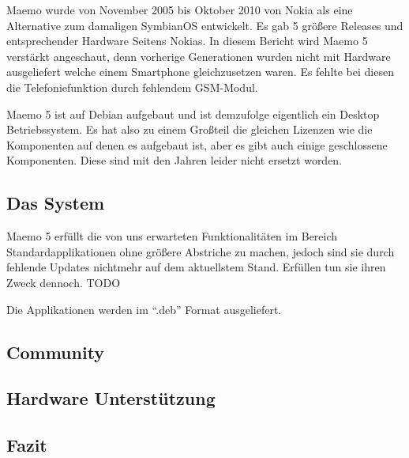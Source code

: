 Maemo wurde von November 2005\cite{online:maemo1-770} bis Oktober 2010\cite{online:maemo5-n900} von Nokia als eine Alternative zum damaligen \mbox{SymbianOS} entwickelt. Es gab 5 größere Releases und entsprechender Hardware Seitens Nokias\cite{online:maemo1-770}\cite{online:n800-specs}\cite{online:n810-specs}\cite{online:n900-specs}. In diesem Bericht wird Maemo 5 verstärkt angeschaut, denn vorherige Generationen wurden nicht mit Hardware ausgeliefert welche einem Smartphone gleichzusetzen waren. Es fehlte bei diesen die Telefoniefunktion durch fehlendem GSM-Modul.

Maemo 5 ist auf Debian aufgebaut\cite{online:maemo-about} und ist demzufolge eigentlich ein Desktop Betriebssystem. Es hat also zu einem Großteil die gleichen Lizenzen wie die Komponenten auf denen es aufgebaut ist, aber es gibt auch einige geschlossene Komponenten\cite{online:maemo5-components}. Diese sind mit den Jahren leider nicht ersetzt worden.\\

\subsection{Das System}
Maemo 5 erfüllt die von uns erwarteten Funktionalitäten im Bereich Standardapplikationen ohne größere Abstriche zu machen, jedoch sind sie durch fehlende Updates nichtmehr auf dem aktuellstem Stand. Erfüllen tun sie ihren Zweck dennoch. TODO

Die Applikationen werden im ``.deb'' Format ausgeliefert.  

\subsection{Community}

\subsection{Hardware Unterstützung}

\subsection{Fazit}